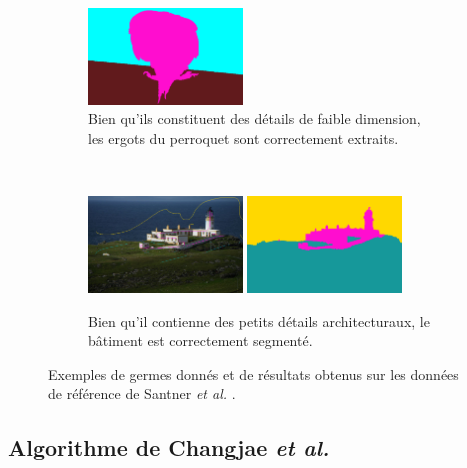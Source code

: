 \begin{emodif}
\begin{figure}[htb]
\begin{subfigure}[B]{\textwidth}
			\includegraphics[width=0.45\textwidth]{images/evaluation/Santner/image_0236_seg}
		 \caption{Bien qu'ils constituent des détails de faible dimension, les ergots du perroquet sont correctement extraits. }
	\end{subfigure}	
	\\	
	 \begin{subfigure}[B]{\textwidth}	
	 \centering
			\includegraphics[width=0.45\textwidth]{images/evaluation/Santner/image_0030_seeds}
			\includegraphics[width=0.45\textwidth]{images/evaluation/Santner/image_0030_seg}
		 \caption{Bien qu'il contienne des petits détails architecturaux, le bâtiment est correctement segmenté.}
	\end{subfigure}	
	\caption{Exemples de germes donnés et de résultats obtenus sur les données de référence de Santner \textit{et al.} \cite{santner2010interactive}.}
	\label{fig:eval:ResST}
\end{figure}
\end{emodif}


\subsection{Algorithme de Changjae \textit{et al.}}

